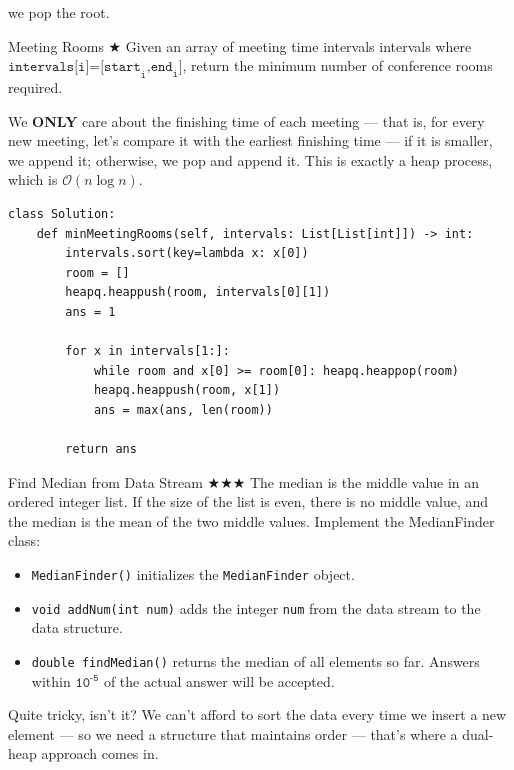 \documentclass{article}
\begin{document}
we pop the root.

\begin{Question}{Meeting Rooms $\bigstar$}
Given an array of meeting time intervals intervals where $\texttt{intervals[i]=[start}_{\texttt{i}}\texttt{,end}_{\texttt{i}}\texttt{]}$, return the minimum number of conference rooms required.
\end{Question}

We \textbf{ONLY} care about the finishing time of each meeting --- that is, for every new meeting, let's compare it with the earliest finishing time --- if it is smaller, we append it; otherwise, we pop and append it. This is exactly a heap process, which is $\mathcal O(n\log n)$.

\begin{lstlisting}[style=python]
class Solution:
    def minMeetingRooms(self, intervals: List[List[int]]) -> int:
        intervals.sort(key=lambda x: x[0])
        room = []
        heapq.heappush(room, intervals[0][1])
        ans = 1
        
        for x in intervals[1:]:
            while room and x[0] >= room[0]: heapq.heappop(room)
            heapq.heappush(room, x[1])
            ans = max(ans, len(room))
            
        return ans
\end{lstlisting}

\begin{Question}{Find Median from Data Stream $\bigstar\bigstar\bigstar$}
The median is the middle value in an ordered integer list. If the size of the list is even, there is no middle value, and the median is the mean of the two middle values. Implement the MedianFinder class:
\begin{itemize}
    \item \texttt{MedianFinder()} initializes the \texttt{MedianFinder} object.
    \item \texttt{void addNum(int num)} adds the integer \texttt{num} from the data stream to the data structure.
    \item \texttt{double findMedian()} returns the median of all elements so far. Answers within $\texttt{10}^{\texttt{-5}}$ of the actual answer will be accepted.
\end{itemize}
\end{Question}

Quite tricky, isn't it? We can’t afford to sort the data every time we insert a new element --- so we need a structure that maintains order --- that’s where a dual-heap approach comes in.
\end{document}
